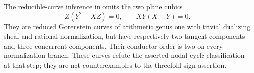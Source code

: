 
\begin{proposition}[P4.14]\hypertarget{tag-02WL}{}\label{night:P4.14}\label{stmt:P4.14}


The reducible-curve inference in \cite[proof of Proposition~7.3,
p.~16 of the attached-source edition]{CDP20} omits the two plane cubics
\[
 Z(Y^2-XZ)=0,\qquad XY(X-Y)=0.
\]
They are reduced Gorenstein curves of arithmetic genus one with
trivial dualizing sheaf and rational normalization, but have
respectively two tangent components and three concurrent
components. Their conductor order is two on every normalization
branch. These curves refute the asserted nodal-cycle
classification at that step; they are not counterexamples to
the threefold sign assertion.
\end{proposition}

